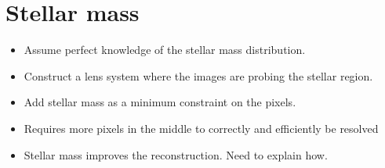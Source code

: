 \documentclass[onecolumn,galley]{mn2e}
\newcommand{\figref}[1] {Figure~\ref{#1}}
\newcommand\plotone[1]{%
 \centering
 \leavevmode
 \texttt{[image: \#1]}%
}%
\begin{document}
%
%
%
%
%
%
%
%
%


\section{Stellar mass}
\begin{itemize}
\item Assume perfect knowledge of the stellar mass distribution.
\item Construct a lens system where the images are probing the stellar region.
\item Add stellar mass as a minimum constraint on the pixels.
\item Requires more pixels in the middle to correctly and efficiently be resolved
\item Stellar mass improves the reconstruction. Need to explain how.
\end{itemize}
\end{document}
